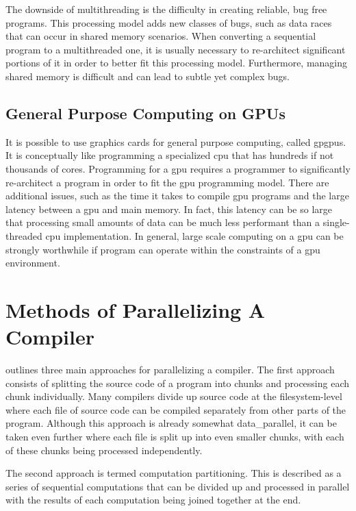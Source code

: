 The downside of multithreading is the difficulty in creating reliable, bug free
programs.  This processing model adds new classes of bugs, such as data races
that can occur in shared memory scenarios.  When converting a sequential program
to a multithreaded one, it is usually necessary to re-architect significant
portions of it in order to better fit this processing model. Furthermore,
managing shared memory is difficult and can lead to subtle yet complex bugs.

\subsection{General Purpose Computing on GPUs} \label{gpgpu}

It is possible to use graphics cards for general purpose computing, called
\glspl{gpgpu}. It is conceptually like programming a specialized \gls{cpu} that
has hundreds if not thousands of cores. Programming for a \gls{gpu} requires
a programmer to significantly re-architect a program in order to fit the
\gls{gpu} programming model. There are additional issues, such as the time it
takes to compile \gls{gpu} programs and the large latency between a \gls{gpu}
and main memory. In fact, this latency can be so large that processing small
amounts of data can be much less performant than a single-threaded \gls{cpu}
implementation. In general, large scale computing on a \gls{gpu} can be
strongly worthwhile if program can operate within the constraints of a \gls{gpu}
environment. 

\section{Methods of Parallelizing A Compiler} \label{compiler_parallel_methods}

\cite{gross_parallel_1989} outlines three main approaches for parallelizing a
compiler. The first approach consists of splitting the source code of a program
into chunks and processing each chunk individually. Many compilers divide up
source code at the filesystem-level where each file of source code can be
compiled separately from other parts of the program. Although this approach is
already somewhat \gls{data_parallel}, it can be taken even further where each
file is split up into even smaller chunks, with each of these chunks being
processed independently.

The second approach is termed computation partitioning. This is described as
a series of sequential computations that can be divided up and processed in
parallel with the results of each computation being joined together at the end.

